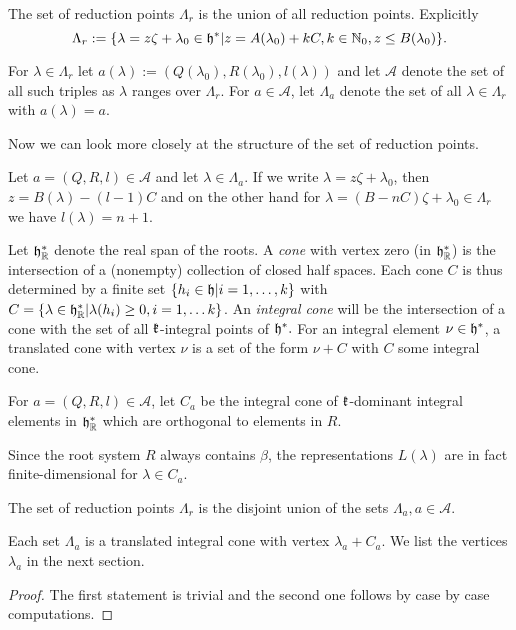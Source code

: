 \begin{definition}
 The set of reduction points $\Lambda_r$ is the union of all reduction points. Explicitly
 \[
 \Lambda_r := \{ \lambda = z\zeta + \lambda_0 \in \mathfrak{h}^* | z = A(\lambda_0) +kC, k\in\mathbb{N}_0, z \leq B(\lambda_0) \}.
 \]

 For $\lambda \in \Lambda_r$ let $a(\lambda) := (Q(\lambda_0),R(\lambda_0),l(\lambda))$ and let $\mathcal{A}$ denote the set of all such triples as $\lambda$ ranges over $\Lambda_r$. For $a\in\mathcal{A}$, let $\Lambda_a$ denote the set of all $\lambda\in\Lambda_r$ with $a(\lambda)=a$.
\end{definition}

Now we can look more closely at the structure of the set of reduction points. 

\begin{corollary}
 Let $a=(Q,R,l)\in\mathcal{A}$ and let $\lambda\in\Lambda_a$. If we write $\lambda= z\zeta + \lambda_0$, then $z=B(\lambda)-(l-1)C$ and on the other hand for $\lambda=(B - nC)\zeta + \lambda_0 \in \Lambda_r$ we have $l(\lambda) =n+1$.
\end{corollary}

Let $\mathfrak{h}^*_{\mathbb{R}}$ denote the real span of the roots. A \emph{cone} with vertex zero (in $\mathfrak{h}^*_{\mathbb{R}}$) is the intersection of a (nonempty) collection of closed half spaces. Each cone $C$ is thus determined by a finite set $\{h_i \in \mathfrak{h}|i=1,\ldots,k\}$ with $C= \{ \lambda \in \mathfrak{h}^*_{\mathbb{R}} | \lambda(h_i) \geq 0, i=1,\ldots k\}$. An \emph{integral cone} will be the intersection of a cone with the set of all $\mathfrak{k}$-integral points of $\mathfrak{h}^*.$ For an integral element $\nu\in\mathfrak{h}^*$, a translated cone with vertex $\nu$ is a set of the form $\nu + C$ with $C$ some integral cone.

\begin{definition}
 For $a=(Q,R,l)\in\mathcal{A}$, let $C_a$ be the integral cone of $\mathfrak{k}$-dominant integral elements in $\mathfrak{h}^*_{\mathbb{R}}$ which are orthogonal to elements in $R$.
\end{definition}

Since the root system $R$ always contains $\beta$, the representations $L(\lambda)$ are in fact finite-dimensional for $\lambda\in C_a$.

\begin{proposition}
 The set of reduction points $\Lambda_r$ is the disjoint union of the sets $\Lambda_a, a\in\mathcal{A}$.

 Each set $\Lambda_a$ is a translated integral cone with vertex $\lambda_a + C_a$. We list the vertices $\lambda_a$ in the next section.
\end{proposition}
\begin{proof}
 The first statement is trivial and the second one follows by case by case computations.
\end{proof}

